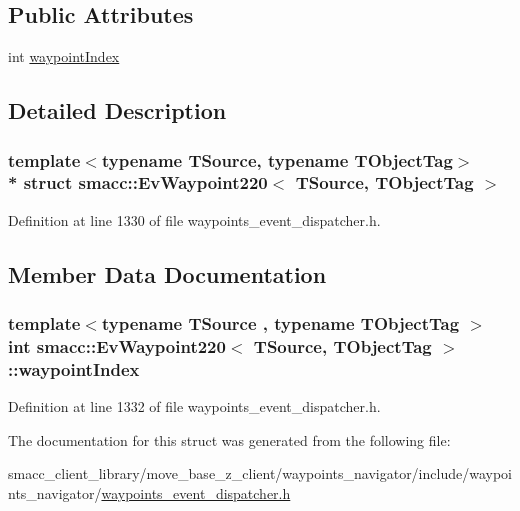 \subsection*{Public Attributes}
\begin{DoxyCompactItemize}
\item 
int \hyperlink{structsmacc_1_1EvWaypoint220_a23c0fbc426d1a1b780024b1503af5fdc}{waypoint\+Index}
\end{DoxyCompactItemize}


\subsection{Detailed Description}
\subsubsection*{template$<$typename T\+Source, typename T\+Object\+Tag$>$\\*
struct smacc\+::\+Ev\+Waypoint220$<$ T\+Source, T\+Object\+Tag $>$}



Definition at line 1330 of file waypoints\+\_\+event\+\_\+dispatcher.\+h.



\subsection{Member Data Documentation}
\subsubsection[{\texorpdfstring{waypoint\+Index}{waypointIndex}}]{\setlength{\rightskip}{0pt plus 5cm}template$<$typename T\+Source , typename T\+Object\+Tag $>$ int {\bf smacc\+::\+Ev\+Waypoint220}$<$ T\+Source, T\+Object\+Tag $>$\+::waypoint\+Index}\hypertarget{structsmacc_1_1EvWaypoint220_a23c0fbc426d1a1b780024b1503af5fdc}{}\label{structsmacc_1_1EvWaypoint220_a23c0fbc426d1a1b780024b1503af5fdc}


Definition at line 1332 of file waypoints\+\_\+event\+\_\+dispatcher.\+h.



The documentation for this struct was generated from the following file\+:\begin{DoxyCompactItemize}
\item 
smacc\+\_\+client\+\_\+library/move\+\_\+base\+\_\+z\+\_\+client/waypoints\+\_\+navigator/include/waypoints\+\_\+navigator/\hyperlink{waypoints__event__dispatcher_8h}{waypoints\+\_\+event\+\_\+dispatcher.\+h}\end{DoxyCompactItemize}
